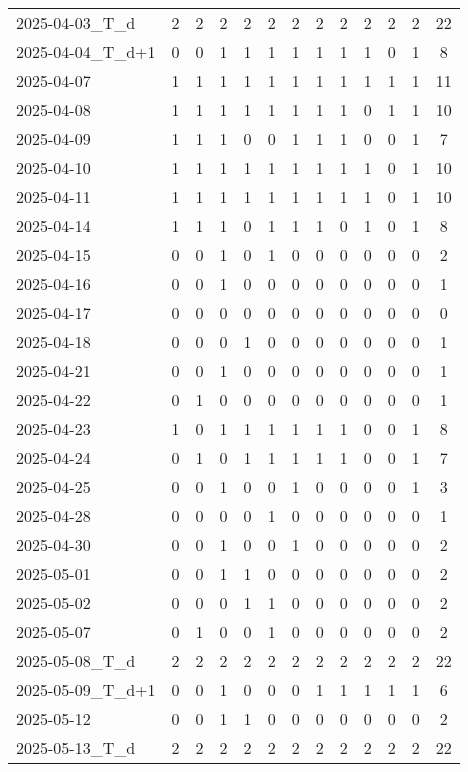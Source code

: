 \documentclass[dvipdfmx,oneside]{article}
\begin{document}
\begin{longtable}{lcccccccccccc}
2025-04-03\_T\_d & 2 & 2 & 2 & 2 & 2 & 2 & 2 & 2 & 2 & 2 & 2 & 22 \\
2025-04-04\_T\_d+1 & 0 & 0 & 1 & 1 & 1 & 1 & 1 & 1 & 1 & 0 & 1 & 8 \\
2025-04-07 & 1 & 1 & 1 & 1 & 1 & 1 & 1 & 1 & 1 & 1 & 1 & 11 \\
2025-04-08 & 1 & 1 & 1 & 1 & 1 & 1 & 1 & 1 & 0 & 1 & 1 & 10 \\
2025-04-09 & 1 & 1 & 1 & 0 & 0 & 1 & 1 & 1 & 0 & 0 & 1 & 7 \\
2025-04-10 & 1 & 1 & 1 & 1 & 1 & 1 & 1 & 1 & 1 & 0 & 1 & 10 \\
2025-04-11 & 1 & 1 & 1 & 1 & 1 & 1 & 1 & 1 & 1 & 0 & 1 & 10 \\
2025-04-14 & 1 & 1 & 1 & 0 & 1 & 1 & 1 & 0 & 1 & 0 & 1 & 8 \\
2025-04-15 & 0 & 0 & 1 & 0 & 1 & 0 & 0 & 0 & 0 & 0 & 0 & 2 \\
2025-04-16 & 0 & 0 & 1 & 0 & 0 & 0 & 0 & 0 & 0 & 0 & 0 & 1 \\
2025-04-17 & 0 & 0 & 0 & 0 & 0 & 0 & 0 & 0 & 0 & 0 & 0 & 0 \\
2025-04-18 & 0 & 0 & 0 & 1 & 0 & 0 & 0 & 0 & 0 & 0 & 0 & 1 \\
2025-04-21 & 0 & 0 & 1 & 0 & 0 & 0 & 0 & 0 & 0 & 0 & 0 & 1 \\
2025-04-22 & 0 & 1 & 0 & 0 & 0 & 0 & 0 & 0 & 0 & 0 & 0 & 1 \\
2025-04-23 & 1 & 0 & 1 & 1 & 1 & 1 & 1 & 1 & 0 & 0 & 1 & 8 \\
2025-04-24 & 0 & 1 & 0 & 1 & 1 & 1 & 1 & 1 & 0 & 0 & 1 & 7 \\
2025-04-25 & 0 & 0 & 1 & 0 & 0 & 1 & 0 & 0 & 0 & 0 & 1 & 3 \\
2025-04-28 & 0 & 0 & 0 & 0 & 1 & 0 & 0 & 0 & 0 & 0 & 0 & 1 \\
2025-04-30 & 0 & 0 & 1 & 0 & 0 & 1 & 0 & 0 & 0 & 0 & 0 & 2 \\
2025-05-01 & 0 & 0 & 1 & 1 & 0 & 0 & 0 & 0 & 0 & 0 & 0 & 2 \\
2025-05-02 & 0 & 0 & 0 & 1 & 1 & 0 & 0 & 0 & 0 & 0 & 0 & 2 \\
2025-05-07 & 0 & 1 & 0 & 0 & 1 & 0 & 0 & 0 & 0 & 0 & 0 & 2 \\
2025-05-08\_T\_d & 2 & 2 & 2 & 2 & 2 & 2 & 2 & 2 & 2 & 2 & 2 & 22 \\
2025-05-09\_T\_d+1 & 0 & 0 & 1 & 0 & 0 & 0 & 1 & 1 & 1 & 1 & 1 & 6 \\
2025-05-12 & 0 & 0 & 1 & 1 & 0 & 0 & 0 & 0 & 0 & 0 & 0 & 2 \\
2025-05-13\_T\_d & 2 & 2 & 2 & 2 & 2 & 2 & 2 & 2 & 2 & 2 & 2 & 22 \\

\end{longtable}
\end{document}
